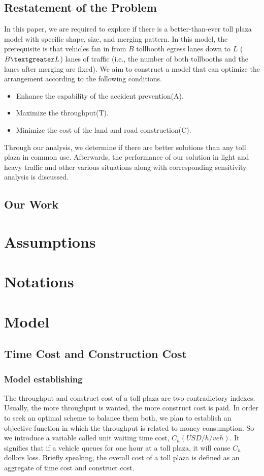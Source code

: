 \documentclass{mcmthesis}
\begin{document}
\subsection{Restatement of the Problem}
In this paper, we are required to explore if there is a
better-than-ever toll plaza model with specific shape,
size, and merging pattern. In this model, the prerequisite
is that vehicles fan in from $B$ tollbooth egress lanes down
to $L$ ($B\textgreater L$) lanes of traffic (i.e., the number of both
tollbooths and the lanes after merging are fixed). We aim
to construct a model that can optimize the arrangement
according to the following conditions.

\begin{itemize}
\item Enhance the capability of the accident prevention(A).
\item Maximize the throughput(T).
\item Minimize the cost of the land and road
construction(C).
\end{itemize}

Through our analysis, we determine if there are better
solutions than any toll plaza in common use. Afterwards,
the performance of our solution in light and heavy traffic
and other various situations along with corresponding
sensitivity analysis is discussed.

\subsection{Our Work}

\section{Assumptions}

\section{Notations}

\section{Model}
\subsection{Time Cost and Construction Cost}

\subsubsection{Model establishing}
The throughput and construct cost of a toll plaza are
two contradictory indexes. Usually, the more throughput
is wanted, the more construct cost is paid. In order to
seek an optimal scheme to balance them both, we plan
to establish an objective function in which the throughput
is related to money consumption. So we introduce a
variable called unit waiting time cost, $C_h (USD/h/veh)$.
It signifies that if a vehicle queues for one hour at
a toll plaza, it will cause $C_h$ dollors loss.
Briefly speaking, the overall cost of a toll plaza
is defined as an aggregate of time cost and construct
cost.
\end{document}
